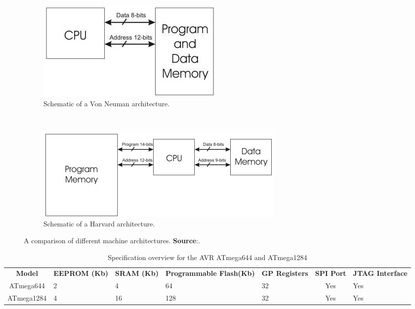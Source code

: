\documentclass[10pt,a4paper,twocolumn]{article}
\begin{document}
\begin{figure}
	\begin{subfigure}{0.5\textwidth}
		\center
		\includegraphics[scale=0.5]{img/von_neuman_arch.jpg}
		\caption{Schematic of a Von Neuman architecture.}
		\label{fig:VN_arch}
	\end{subfigure} 
	~
	\begin{subfigure}{0.5\textwidth}
		\center
		\includegraphics[scale=0.5]{img/harvard_arch.jpeg}
		\caption{Schematic of a Harvard architecture.}
		\label{fig:H_arch}
	\end{subfigure}
	\caption{A comparison of different machine architectures. \textbf{Source}:\protect\citep{website:mcu_primer}.}
	\label{fig:architectures}
\end{figure}	
		
	\begin{table}
		\begin{tabular}{| c | p{2cm} | p{1.5cm} | p{3cm} | p{2.8cm} | c | p{1.9cm} |}
		\textbf{Model} & \textbf{EEPROM (Kb)} & \textbf{SRAM (Kb)} & \textbf{Programmable Flash(Kb)} & \textbf{GP Registers} & \textbf{SPI Port} & \textbf{JTAG Interface}\\
		ATmega644 & 2 & 4 & 64 & 32 & Yes & Yes\\
		ATmega1284 & 4 & 16 & 128 & 32 & Yes & Yes \\
		
		
		\end{tabular}
	\caption{Specification overview for the AVR ATmega644 and ATmega1284}
	\label{table:avr_specs}
	\end{table}
	
\end{document}
